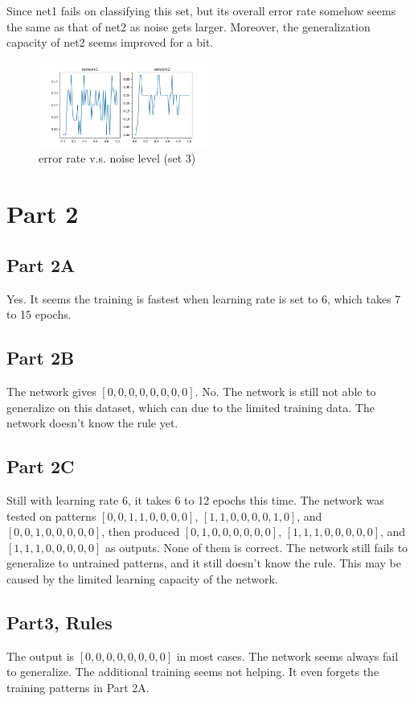 \documentclass{article}
\begin{document}
Since net1 fails on classifying this set, but its overall error rate somehow seems the same as that of net2 as noise gets larger. Moreover, the generalization capacity of net2 seems improved for a bit.
\begin{figure}[!ht]
    \centering
    \includegraphics[width=0.5\textwidth]{part1set3g.png}
    \caption{error rate v.s. noise level (set 3)}
\end{figure}
\newpage

\section*{Part 2}
\subsection*{Part 2A}
Yes. It seems the training is fastest when learning rate is set to 6, which takes 7 to 15 epochs.
\subsection*{Part 2B}
The network gives $[0, 0, 0, 0, 0, 0, 0, 0]$. No. The network is still not able to generalize on this dataset, which can due to the limited training data. The network doesn't know the rule yet.
\subsection*{Part 2C}
Still with learning rate 6, it takes 6 to 12 epochs this time. The network was tested on patterns $[0, 0, 1, 1, 0, 0, 0, 0]$, $[1, 1, 0, 0, 0, 0, 1, 0]$, and $[0, 0, 1, 0, 0, 0, 0, 0]$, then produced $[0, 1, 0, 0, 0, 0, 0, 0]$, $[1, 1, 1, 0, 0, 0, 0, 0]$, and $[1, 1, 1, 0, 0, 0, 0, 0]$ as outputs. None of them is correct. The network still fails to generalize to untrained patterns, and it still doesn't know the rule. This may be caused by the limited learning capacity of the network.
\subsection*{Part3, Rules}
The output is $[0, 0, 0, 0, 0, 0, 0, 0]$ in most cases. The network seems always fail to generalize. The additional training seems not helping. It even forgets the training patterns in Part 2A. 
\end{document}
